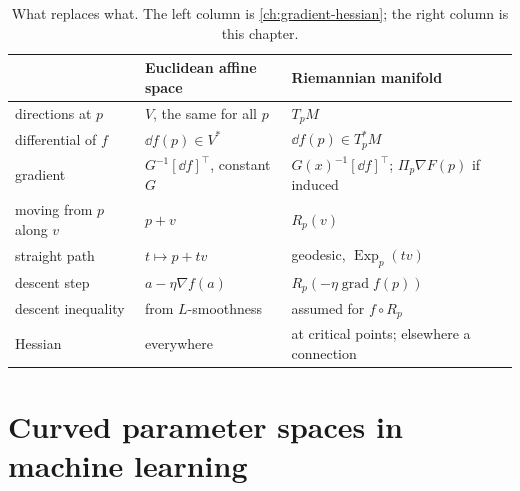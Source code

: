 \begin{notechapter}
\begin{table}[ht]
\centering
\small
\begin{tabular}{@{}lll@{}}
\toprule
 & Euclidean affine space & Riemannian manifold \\
\midrule
directions at $p$ & $V$, the same for all $p$ & $T_pM$ \\
differential of $f$ & $\dd f(p)\in V^*$ & $\dd f(p)\in T_p^*M$ \\
gradient & $G^{-1}[\dd f]^\top$, constant $G$
  & $G(x)^{-1}[\dd f]^\top$; $\Pi_p\nabla F(p)$ if induced \\
moving from $p$ along $v$ & $p + v$ & $R_p(v)$ \\
straight path & $t\mapsto p + tv$ & geodesic, $\operatorname{Exp}_p(tv)$ \\
descent step & $a - \eta\nabla f(a)$
  & $R_p(-\eta\operatorname{grad}f(p))$ \\
descent inequality & from $L$-smoothness
  & assumed for $f\circ R_p$ \\
Hessian & everywhere & at critical points; elsewhere a connection \\
\bottomrule
\end{tabular}
\caption{What replaces what. The left column is
\cref{ch:gradient-hessian}; the right column is this chapter.}
\label{riemannian-optimization:tab:dictionary}
\end{table}

\section{Curved parameter spaces in machine learning}
\label{riemannian-optimization:sec:ml}


\end{notechapter}
